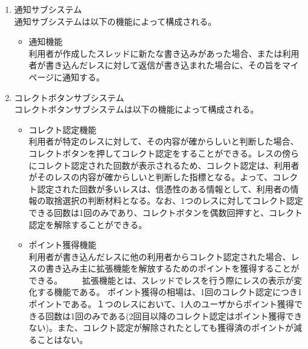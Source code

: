 \documentclass[a4j]{jarticle}
\begin{document}
\begin{enumerate}
  \item 通知サブシステム\\
  通知サブシステムは以下の機能によって構成される。
  \begin{itemize}
    \item 通知機能\\
    利用者が作成したスレッドに新たな書き込みがあった場合、または利用者が書き込んだレスに対して返信が書き込まれた場合に、その旨をマイページに通知する。
  \end{itemize}

  \item コレクトボタンサブシステム\\
  コレクトボタンサブシステムは以下の機能によって構成される。
  \begin{itemize}
    \item コレクト認定機能\\
    利用者が特定のレスに対して、その内容が確からしいと判断した場合、コレクトボタンを押してコレクト認定をすることができる。レスの傍らにコレクト認定された回数が表示されるため、コレクト認定は、利用者がそのレスの内容が確からしいと判断した指標となる。よって、コレクト認定された回数が多いレスは、信憑性のある情報として、利用者の情報の取捨選択の判断材料となる。なお、1つのレスに対してコレクト認定できる回数は1回のみであり、コレクトボタンを偶数回押すと、コレクト認定を解除することができる。
    \item ポイント獲得機能\\
    利用者が書き込んだレスに他の利用者からコレクト認定された場合、レスの書き込み主に拡張機能を解放するためのポイントを獲得することができる。
　　拡張機能とは、スレッドでレスを行う際にレスの表示が変化する機能である。
    ポイント獲得の相場は、1回のコレクト認定につき1ポイントである。１つのレスにおいて、1人のユーザからポイント獲得できる回数は1回のみである(2回目以降のコレクト認定はポイント獲得できない)。また、コレクト認定が解除されたとしても獲得済のポイントが減ることはない。
  \end{itemize}


\end{enumerate}
\end{document}

